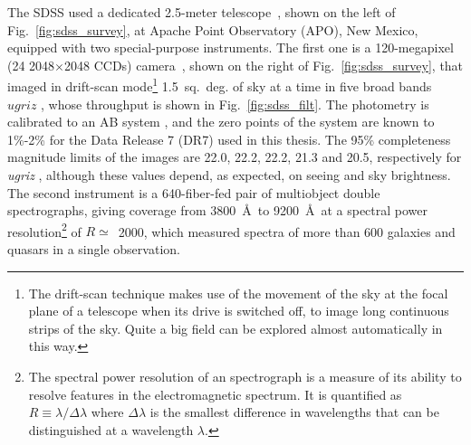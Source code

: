 The SDSS used a dedicated 2.5-meter telescope~\citep{Gunn2006}, shown on the left of Fig.~\ref{fig:sdss_survey}, at Apache Point Observatory (APO), New Mexico, equipped with two special-purpose instruments. The first one is a 120-megapixel (24 2048$\times$2048 CCDs) camera~\citep{Gunn1998}, shown on the right of Fig.~\ref{fig:sdss_survey}, that imaged in drift-scan mode\footnote{The drift-scan technique makes use of the movement of the sky at the focal plane of a telescope when its drive is switched off, to image long continuous strips of the sky. Quite a big field can be explored almost automatically in this way.} 1.5~sq.~deg. of sky at a time in five broad bands $ugriz$ \citep{Fukugita1996}, whose throughput is shown in Fig.~\ref{fig:sdss_filt}. The photometry is calibrated to an AB system \citep{Oke1983}, and the zero points of the system are known to 1\%-2\% \citep{Abazajian2004} for the Data Release 7 (DR7) used in this thesis. The 95\% completeness magnitude limits of the images are 22.0, 22.2, 22.2, 21.3 and 20.5, respectively for \textit{ugriz} \citep{Abazajian2004}, although these values depend, as expected, on seeing and sky brightness. The second instrument is a 640-fiber-fed pair of multiobject double spectrographs, giving coverage from 3800~\AA \ to 9200~\AA \ at a spectral power resolution\footnote{The spectral power resolution of an spectrograph is a measure of its ability to resolve features in the electromagnetic spectrum. It is quantified as $R \equiv \lambda / \Delta \lambda$ where $\Delta \lambda$ is the smallest difference in wavelengths that can be distinguished at a wavelength $\lambda$.} of $R\simeq$~2000, which measured spectra of more than 600 galaxies and quasars in a single observation. 

